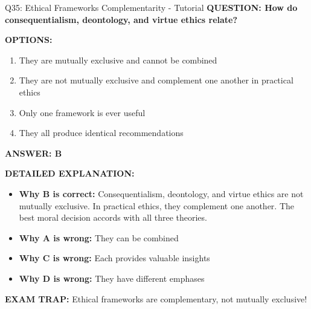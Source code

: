 \documentclass[8pt]{beamer}
\begin{document}
	\begin{frame}{Q35: Ethical Frameworks Complementarity - Tutorial}
		\fontsize{6.5}{7.5}\selectfont
		\textbf{QUESTION: How do consequentialism, deontology, and virtue ethics relate?}
		
		\vspace{0.1cm}
		\textbf{OPTIONS:}
		\begin{enumerate}
			\item They are mutually exclusive and cannot be combined
			\item They are not mutually exclusive and complement one another in practical ethics
			\item Only one framework is ever useful
			\item They all produce identical recommendations
		\end{enumerate}
		
		\vspace{0.1cm}
		\textcolor{myblue}{\textbf{ANSWER: B}}
		
		\vspace{0.1cm}
		\textbf{DETAILED EXPLANATION:}
		\begin{itemize}
			\item \textbf{Why B is correct:} Consequentialism, deontology, and virtue ethics are not mutually exclusive. In practical ethics, they complement one another. The best moral decision accords with all three theories.
			\item \textbf{Why A is wrong:} They can be combined
			\item \textbf{Why C is wrong:} Each provides valuable insights
			\item \textbf{Why D is wrong:} They have different emphases
		\end{itemize}
		
		\textcolor{myred}{\textbf{EXAM TRAP:}} Ethical frameworks are \textcolor{myblue}{complementary, not mutually exclusive}!
	\end{frame}
	
	
\end{document}
